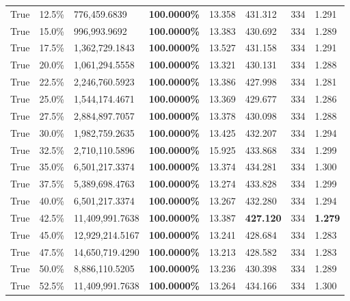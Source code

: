 \begin{table}[H]
\begin{tabular}{lllrllll}
\cline{1-8}
True & 12.5\% & 776,459.6839 & \bfseries \color{red} 100.0000\% & 13.358 & 431.312 & 334 & 1.291 \\
\cline{1-8}
True & 15.0\% & 996,993.9692 & \bfseries \color{red} 100.0000\% & 13.383 & 430.692 & 334 & 1.289 \\
\cline{1-8}
True & 17.5\% & 1,362,729.1843 & \bfseries \color{red} 100.0000\% & 13.527 & 431.158 & 334 & 1.291 \\
\cline{1-8}
True & 20.0\% & 1,061,294.5558 & \bfseries \color{red} 100.0000\% & 13.321 & 430.131 & 334 & 1.288 \\
\cline{1-8}
True & 22.5\% & 2,246,760.5923 & \bfseries \color{red} 100.0000\% & 13.386 & 427.998 & 334 & 1.281 \\
\cline{1-8}
True & 25.0\% & 1,544,174.4671 & \bfseries \color{red} 100.0000\% & 13.369 & 429.677 & 334 & 1.286 \\
\cline{1-8}
True & 27.5\% & 2,884,897.7057 & \bfseries \color{red} 100.0000\% & 13.378 & 430.098 & 334 & 1.288 \\
\cline{1-8}
True & 30.0\% & 1,982,759.2635 & \bfseries \color{red} 100.0000\% & 13.425 & 432.207 & 334 & 1.294 \\
\cline{1-8}
True & 32.5\% & 2,710,110.5896 & \bfseries \color{red} 100.0000\% & 15.925 & 433.868 & 334 & 1.299 \\
\cline{1-8}
True & 35.0\% & 6,501,217.3374 & \bfseries \color{red} 100.0000\% & 13.374 & 434.281 & 334 & 1.300 \\
\cline{1-8}
True & 37.5\% & 5,389,698.4763 & \bfseries \color{red} 100.0000\% & 13.274 & 433.828 & 334 & 1.299 \\
\cline{1-8}
True & 40.0\% & 6,501,217.3374 & \bfseries \color{red} 100.0000\% & 13.267 & 432.280 & 334 & 1.294 \\
\cline{1-8}
True & 42.5\% & 11,409,991.7638 & \bfseries \color{red} 100.0000\% & 13.387 & \bfseries \color{red} 427.120 & 334 & \bfseries \color{red} 1.279 \\
\cline{1-8}
True & 45.0\% & 12,929,214.5167 & \bfseries \color{red} 100.0000\% & 13.241 & 428.684 & 334 & 1.283 \\
\cline{1-8}
True & 47.5\% & 14,650,719.4290 & \bfseries \color{red} 100.0000\% & 13.213 & 428.582 & 334 & 1.283 \\
\cline{1-8}
True & 50.0\% & 8,886,110.5205 & \bfseries \color{red} 100.0000\% & 13.236 & 430.398 & 334 & 1.289 \\
\cline{1-8}
True & 52.5\% & 11,409,991.7638 & \bfseries \color{red} 100.0000\% & 13.264 & 434.166 & 334 & 1.300 \\

\end{tabular}
\end{table}

